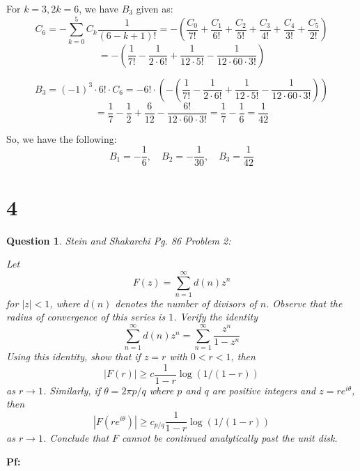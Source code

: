 \documentclass{article}
\newtheorem{question}{Question}
\begin{document}
For $k=3,2k=6$, we have $B_3$ given as:
$$C_6=-\sum_{k=0}^{5}C_k\frac{1}{(6-k+1)!}=-\left(\frac{C_0}{7!}+\frac{C_1}{6!}+\frac{C_2}{5!}+\frac{C_3}{4!}+\frac{C_4}{3!}+\frac{C_5}{2!}\right)$$
$$=-\left(\frac{1}{7!}-\frac{1}{2\cdot 6!}+\frac{1}{12\cdot 5!}-\frac{1}{12\cdot 60\cdot 3!}\right)$$

$$B_3=(-1)^3\cdot 6!\cdot C_6 = -6!\cdot \left(-\left(\frac{1}{7!}-\frac{1}{2\cdot 6!}+\frac{1}{12\cdot 5!}-\frac{1}{12\cdot 60\cdot 3!}\right)\right)$$
$$=\frac{1}{7}-\frac{1}{2}+\frac{6}{12}-\frac{6!}{12\cdot 60 \cdot 3!}=\frac{1}{7}-\frac{1}{6}=\frac{1}{42}$$

So, we have the following:
$$B_1=-\frac{1}{6},\quad B_2=-\frac{1}{30},\quad B_3=\frac{1}{42}$$

\break

\section*{4}
\begin{myBox}[]{}
    \begin{question}
        Stein and Shakarchi Pg. 86 Problem 2:

        Let 
        $$F(z)=\sum_{n=1}^{\infty}d(n)z^n$$
        for $|z|<1$, where $d(n)$ denotes the number of divisors of $n$. Observe that the radius of convergence of this series is $1$.
        Verify the identity
        $$\sum_{n=1}^{\infty}d(n)z^n=\sum_{n=1}^{\infty}\frac{z^n}{1-z^n}$$
        Using this identity, show that if $z=r$ with $0<r<1$, then
        $$|F(r)|\geq c\frac{1}{1-r}\log(1/(1-r))$$
        as $r\rightarrow 1$. Similarly, if $\theta = 2\pi p/q$ where $p$ and $q$ are positive integers and $z=re^{i\theta}$, then
        $$|F(re^{i\theta})|\geq c_{p/q}\frac{1}{1-r}\log(1/(1-r))$$
        as $r\rightarrow 1$. Conclude that $F$ cannot be continued analytically past the unit disk.
    \end{question}
\end{myBox}

\textbf{Pf:}
\end{document}
